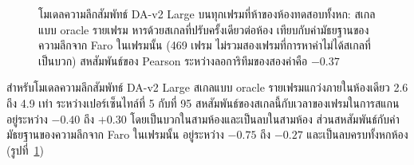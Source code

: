 \begin{figure}[t]
\centering
{}
\caption{โมเดลความลึกสัมพัทธ์ \mbox{DA-v2} Large บนทุกเฟรมที่ห้าของห้องทดสอบทั้งหก: สเกลแบบ oracle รายเฟรม
หารด้วยสเกลที่ปรับครั้งเดียวต่อห้อง เทียบกับค่ามัธยฐานของความลึกจาก Faro ในเฟรมนั้น (469 เฟรม
ไม่รวมสองเฟรมที่การหาค่าไม่ได้สเกลที่เป็นบวก) สหสัมพันธ์ของ Pearson ระหว่างลอการิทึมของสองค่าคือ $-0.37$}
\label{fig:scalevsdepth}
\end{figure}

สำหรับโมเดลความลึกสัมพัทธ์ \mbox{DA-v2} Large สเกลแบบ oracle รายเฟรมแกว่งภายในห้องเดียว 2.6 ถึง 4.9 เท่า
ระหว่างเปอร์เซ็นไทล์ที่ 5 กับที่ 95 สหสัมพันธ์ของสเกลนี้กับเวลาของเฟรมในการสแกน อยู่ระหว่าง $-0.40$ ถึง $+0.30$
โดยเป็นบวกในสามห้องและเป็นลบในสามห้อง ส่วนสหสัมพันธ์กับค่ามัธยฐานของความลึกจาก Faro ในเฟรมนั้น
อยู่ระหว่าง $-0.75$ ถึง $-0.27$ และเป็นลบครบทั้งหกห้อง (รูปที่~\ref{fig:scalevsdepth})

